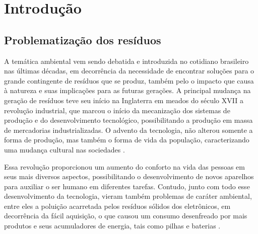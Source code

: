 \documentclass[
	12pt,				%
	openany,			%
	twoside,			%
	a4paper,			%
	english,			%
	french,				%
	spanish,			%
	brazil				%
	]{abntex2}
\begin{document}


\tableofcontents*
\cleardoublepage




\textual





\chapter{Introdução}
\section{Problematização dos resíduos}
A temática ambiental vem sendo debatida e introduzida no cotidiano brasileiro nas últimas décadas, em decorrência da necessidade de encontrar soluções para o grande contingente de resíduos que se produz, também pelo o impacto que causa à natureza e suas implicações para as futuras gerações. A principal mudança na geração de resíduos teve seu início na Inglaterra em meados do século XVII a revolução industrial, que marcou o início da mecanização dos sistemas de produção e do desenvolvimento tecnológico, possibilitando a produção em massa de mercadorias industrializadas. O advento da tecnologia, não alterou somente a forma de produção, mas também o forma de vida da população, caracterizando uma mudança cultural nas sociedades \cite{aftc}.

Essa revolução proporcionou um aumento do conforto na vida das pessoas em seus mais diversos aspectos, possibilitando o desenvolvimento de novos aparelhos para auxiliar o ser humano em diferentes tarefas. Contudo, junto com todo esse desenvolvimento da tecnologia, vieram também problemas de caráter ambiental, entre eles a poluição acarretada pelos resíduos sólidos dos eletrônicos, em decorrência da fácil aquisição, o que causou um consumo desenfreado por mais produtos e seus acumuladores de energia, tais como pilhas e baterias \cite{rqne}.
\end{document}
